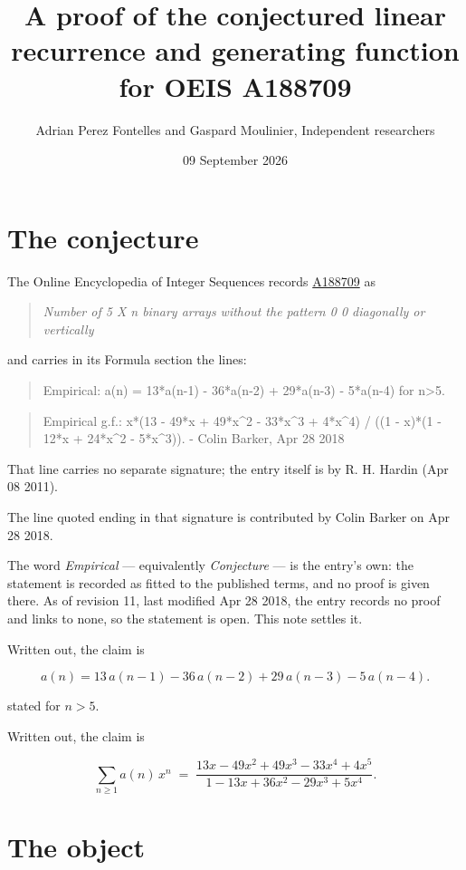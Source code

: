 \documentclass[11pt]{article}
\title{A proof of the conjectured linear recurrence and generating function for OEIS A188709}
\author{Adrian Perez Fontelles and Gaspard Moulinier, Independent researchers}
\date{09 September 2026}
\theoremstyle{definition}
\begin{document}
\maketitle
\section{The conjecture}

The Online Encyclopedia of Integer Sequences records \href{https://oeis.org/A188709}{A188709} as

\begin{quote}\itshape Number of 5 X n binary arrays without the pattern 0 0 diagonally or vertically\end{quote}

and carries in its Formula section the lines:

\begin{quote}\ttfamily Empirical: a(n) = 13*a(n-1) - 36*a(n-2) + 29*a(n-3) - 5*a(n-4) for n>5.\end{quote}

\begin{quote}\ttfamily Empirical g.f.: x*(13 - 49*x + 49*x\textasciicircum{}2 - 33*x\textasciicircum{}3 + 4*x\textasciicircum{}4) / ((1 - x)*(1 - 12*x + 24*x\textasciicircum{}2 - 5*x\textasciicircum{}3)). - Colin Barker, Apr 28 2018\end{quote}

That line carries no separate signature; the entry itself is by R. H. Hardin (Apr 08 2011).

The line quoted ending in that signature is contributed by Colin Barker on Apr 28 2018.

The word {\itshape Empirical} --- equivalently {\itshape Conjecture} --- is the entry's own: the statement is recorded as fitted to the published terms, and no proof is given there. As of revision 11, last modified Apr 28 2018, the entry records no proof and links to none, so the statement is open. This note settles it.

Written out, the claim is

\[a(n) = 13\,a(n-1) - 36\,a(n-2) + 29\,a(n-3) - 5\,a(n-4).\]

stated for $n > 5$.

Written out, the claim is

\[\sum_{n \ge 1} a(n)\,x^n \;=\; \frac{13x - 49x^{2} + 49x^{3} - 33x^{4} + 4x^{5}}{1 - 13x + 36x^{2} - 29x^{3} + 5x^{4}}.\]

\section{The object}
\end{document}
